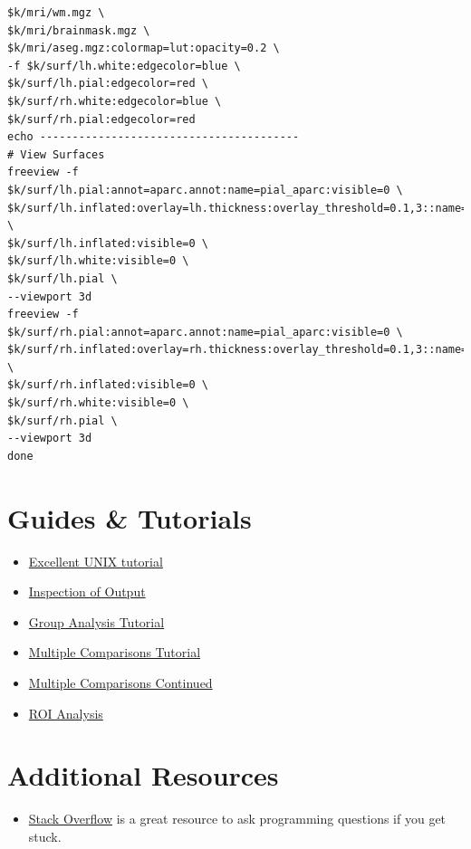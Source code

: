\documentclass[paper=a4, fontsize=11pt]{scrartcl} %
\numberwithin{equation}{section} %
\numberwithin{figure}{section} %
\numberwithin{table}{section} %
\begin{document}
\begin{appendices}
\begin{description}
\begin{lstlisting}
$k/mri/wm.mgz \
$k/mri/brainmask.mgz \
$k/mri/aseg.mgz:colormap=lut:opacity=0.2 \
-f $k/surf/lh.white:edgecolor=blue \
$k/surf/lh.pial:edgecolor=red \
$k/surf/rh.white:edgecolor=blue \
$k/surf/rh.pial:edgecolor=red
echo ----------------------------------------
# View Surfaces
freeview -f  $k/surf/lh.pial:annot=aparc.annot:name=pial_aparc:visible=0 \
$k/surf/lh.inflated:overlay=lh.thickness:overlay_threshold=0.1,3::name=inflated_thickness:visible=0 \
$k/surf/lh.inflated:visible=0 \
$k/surf/lh.white:visible=0 \
$k/surf/lh.pial \
--viewport 3d
freeview -f  $k/surf/rh.pial:annot=aparc.annot:name=pial_aparc:visible=0 \
$k/surf/rh.inflated:overlay=rh.thickness:overlay_threshold=0.1,3::name=inflated_thickness:visible=0 \
$k/surf/rh.inflated:visible=0 \
$k/surf/rh.white:visible=0 \
$k/surf/rh.pial \
--viewport 3d
done
\end{lstlisting}
\end{description}

\section{Guides \& Tutorials}
\begin{itemize}
\item \href{http://www.ee.surrey.ac.uk/Teaching/Unix/}{Excellent UNIX tutorial}
\item \href{https://surfer.nmr.mgh.harvard.edu/fswiki/FsTutorial/OutputData_freeview}{Inspection of Output}
\item \href{http://surfer.nmr.mgh.harvard.edu/fswiki/FsTutorial/GroupAnalysis}{Group Analysis Tutorial}
\item \href{http://surfer.nmr.mgh.harvard.edu/fswiki/FsTutorial/GroupAnalysis#ClusterwiseCorrectionforMultipleComparisons}{Multiple 
Comparisons Tutorial}
\item \href{http://surfer.nmr.mgh.harvard.edu/fswiki/FsTutorial/QdecMultipleComparisons}{Multiple Comparisons Continued}
\item \href{https://surfer.nmr.mgh.harvard.edu/fswiki/FsTutorial/AnatomicalROI}{ROI Analysis}
\end{itemize}
\section{Additional Resources}
\begin{itemize}
\item \href{http://stackoverflow.com}{Stack Overflow} is a great resource to ask programming questions if you get stuck.
\end{itemize}
\end{appendices}


 
\end{document}
